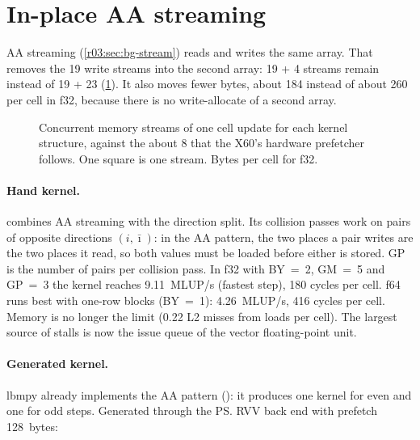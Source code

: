 \section{In-place AA streaming}\label{r03:sec:lever-aa}

AA streaming (\cref{r03:sec:bg-stream}) reads and writes the same array. That removes the 19
write streams into the second array: 19 + 4 streams remain instead of 19 + 23
(\cref{r03:fig:streams-schemes}). It also moves fewer bytes, about 184 instead of about 260
per cell in f32, because there is no write-allocate of a second array.

\begin{figure}[htbp]
  \centering
  \resizebox{\linewidth}{!}{}
  \caption[Memory streams per kernel structure]{Concurrent memory streams of one cell update
    for each kernel structure, against the about 8 that the X60's hardware prefetcher follows.
    One square is one stream. Bytes per cell for f32.}\label{r03:fig:streams-schemes}
\end{figure}

\paragraph{Hand kernel.}  combines AA streaming with
the direction split. Its collision passes work on pairs of opposite directions $(i,
\bar\imath)$: in the AA pattern, the two places a pair writes are the two places it read, so
both values must be loaded before either is stored. GP is the number of pairs per collision
pass. In f32 with BY~=~2, GM~=~5 and GP~=~3 the kernel reaches 9.11~MLUP/s (fastest step), 180
cycles per cell. f64 runs best with one-row blocks (BY~=~1): 4.26~MLUP/s, 416 cycles per cell.
Memory is no longer the limit (0.22 L2 misses from loads per cell). The largest source of
stalls is now the issue queue of the vector floating-point unit.

\paragraph{Generated kernel.} lbmpy already implements the AA pattern
(): it produces one kernel for even and one for odd steps. Generated
through the \ps{} RVV back end with prefetch 128~bytes:

